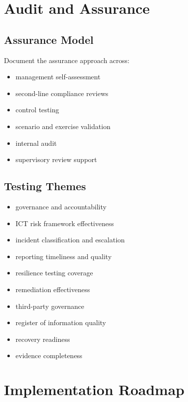 \documentclass[
  letterpaper,
  DIV=11,
  numbers=noendperiod]{scrartcl}
\providecommand{\tightlist}{%
  \setlength{\itemsep}{0pt}\setlength{\parskip}{0pt}}
\begin{document}
\section{Audit and Assurance}\label{audit-and-assurance}

\subsection{Assurance Model}\label{assurance-model}

Document the assurance approach across:

\begin{itemize}
\tightlist
\item
  management self-assessment
\item
  second-line compliance reviews
\item
  control testing
\item
  scenario and exercise validation
\item
  internal audit
\item
  supervisory review support
\end{itemize}

\subsection{Testing Themes}\label{testing-themes}

\begin{itemize}
\tightlist
\item
  governance and accountability
\item
  ICT risk framework effectiveness
\item
  incident classification and escalation
\item
  reporting timeliness and quality
\item
  resilience testing coverage
\item
  remediation effectiveness
\item
  third-party governance
\item
  register of information quality
\item
  recovery readiness
\item
  evidence completeness
\end{itemize}

\section{Implementation Roadmap}\label{implementation-roadmap}
\end{document}
